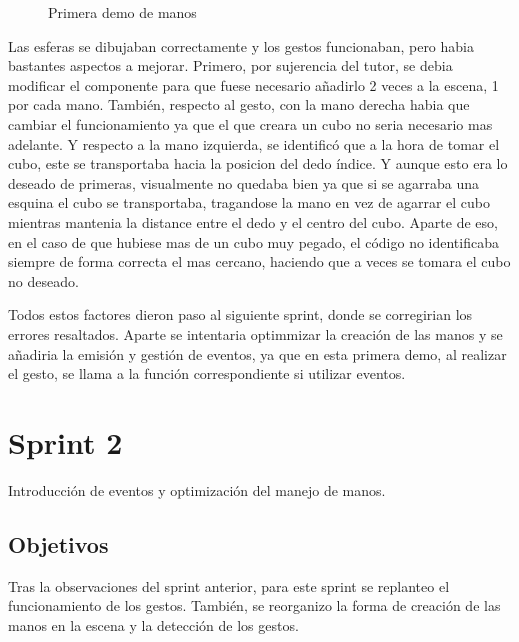 \documentclass[a4paper, 12pt]{book}
\begin{document}
\begin{figure}[H] 
  \centering
  \fbox{\rule{0pt}{150pt} \rule{0.7\textwidth}{0pt}} 
  \caption{Primera demo de manos}
  \label{fig:sprint1}
\end{figure}

Las esferas se dibujaban correctamente y los gestos funcionaban, pero habia bastantes aspectos a mejorar. Primero, por sujerencia del tutor,
se debia modificar el componente para que fuese necesario añadirlo 2 veces a la escena, 1 por cada mano. También, respecto al gesto, con la mano derecha habia que cambiar el funcionamiento
ya que el que creara un cubo no seria necesario mas adelante. Y respecto a la mano izquierda, se identificó que a la hora de tomar el cubo, este se transportaba hacia la posicion del dedo índice. 
Y aunque esto era lo deseado de primeras, visualmente no quedaba bien ya que si se agarraba una esquina el cubo se transportaba, tragandose la mano en vez de agarrar el cubo mientras mantenia la distance entre el dedo y el centro del cubo. 
Aparte de eso, en el caso de que hubiese mas de un cubo muy pegado, el código no identificaba siempre de forma correcta el mas cercano, haciendo que a veces se tomara el cubo no deseado.

Todos estos factores dieron paso al siguiente sprint, donde se corregirian los errores resaltados. Aparte se intentaria optimmizar la creación de las manos y se añadiria la emisión y gestión de eventos, ya que en esta primera demo, al realizar el gesto, se llama a la función correspondiente si utilizar eventos. 

\section{Sprint 2}
\label{sec:sprint2}
Introducción de eventos y optimización del manejo de manos. 

\subsection{Objetivos}
\label{subsec:objetivo-principal2}
Tras la observaciones del sprint anterior, para este sprint se replanteo el funcionamiento de los gestos. También, se reorganizo la forma de creación de las manos en la escena y la detección de los gestos. 
\end{document}
